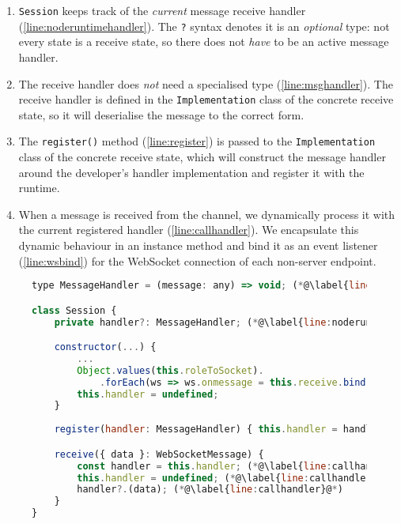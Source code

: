 \begin{enumerate}
\item 
\texttt{Session} keeps track of the \textit{current}
message receive handler (\cref{line:noderuntimehandler}).
The \texttt{?} syntax denotes it is an \textit{optional}
type: not every state is a receive state, so there does not \textit{have} to
be an active message handler.

\item
The receive handler does \textit{not} need a specialised type
(\cref{line:msghandler}). The receive handler is defined in
the \texttt{Implementation} class of the concrete receive state,
so it will deserialise the message to the correct form.

\item
The \texttt{register()} method (\cref{line:register})
is passed to the \texttt{Implementation} class of the concrete
receive state, which will construct the message handler
around the developer's handler implementation and register it
with the runtime.

\item
When a message is received from the channel,
we dynamically process it with 
the current registered handler (\cref{line:callhandler}).
We encapsulate this dynamic behaviour in an instance method
and bind it as an event listener (\cref{line:wsbind})
for the WebSocket connection
of each non-server endpoint.
\end{enumerate}

\begin{figure}[!h]
\begin{lstlisting}[language=javascript,tabsize=2]
type MessageHandler = (message: any) => void; (*@\label{line:msghandler}@*)

class Session {
	private handler?: MessageHandler; (*@\label{line:noderuntimehandler}@*)

	constructor(...) {
		...
		Object.values(this.roleToSocket).
			.forEach(ws => ws.onmessage = this.receive.bind(this)); (*@\label{line:wsbind}@*)
		this.handler = undefined;
	}
	
	register(handler: MessageHandler) { this.handler = handler; } (*@\label{line:register}@*)

	receive({ data }: WebSocketMessage) {
		const handler = this.handler; (*@\label{line:callhandlerstart}@*)
		this.handler = undefined; (*@\label{line:callhandler2}@*)
		handler?.(data); (*@\label{line:callhandler}@*)
	}
}
\end{lstlisting}
\label{lst:noderuntimewsmsg}
\end{figure}

